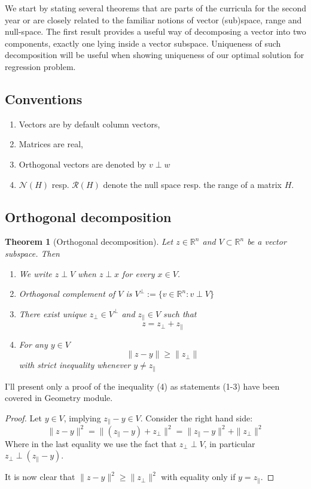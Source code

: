 \documentclass[a4paper]{article}
\theoremstyle{break}
\newtheorem{theorem}{Theorem}[section]
\newcommand{\R}{\mathbb{R}}
\newcommand{\Nu}{\mathcal{N}}
\newcommand{\Ra}{\mathcal{R}}
\newcommand{\pll}{\parallel}
\begin{document}
We start by stating several theorems that are parts of the curricula for the second year or are closely related to the familiar notions of vector (sub)space, range and null-space. The first result provides a useful way of decomposing a vector into two components, exactly one lying inside a vector subspace. Uniqueness of such decomposition will be useful when showing uniqueness of our optimal solution for regression problem.

\subsection{Conventions}
\begin{enumerate}
    \item Vectors are by default column vectors,
    \item Matrices are real,
    \item Orthogonal vectors are denoted by $ v \perp w$
    \item $\Nu(H)$ resp. $\Ra(H)$ denote the null space resp. the range of a matrix $H$.
\end{enumerate}

\subsection{Orthogonal decomposition}

\begin{theorem}[Orthogonal decomposition] \label{thm:projection}
    Let $z \in \R^n$ and $V \subset \R^n$ be a vector subspace. Then
    \begin{enumerate}
        \item We write $z \perp V$ when $ z \perp x$ for every $x \in V$.
        \item Orthogonal complement of $V$ is $V^\perp := \{ v \in \R^n : v \perp V\}$
        \item There exist unique $z_\perp \in V^\perp$ and $z_\pll \in V$ such that  
            \begin{equation}
                z = z_\perp + z_\pll
            \end{equation}
        \item For any $y \in V$
        \begin{equation}
                \| z - y \| \geq \| z_\perp \|
        \end{equation}
        with strict inequality whenever $y \neq z_\pll$
    \end{enumerate}
\end{theorem}
I'll present only a proof of the inequality (4) as statements (1-3) have been covered in Geometry module.
\begin{proof}
    Let $ y \in V $, implying $ z_\pll - y \in V$. Consider the right hand side:
    $$ \| z - y \|^2 = \| (z_\pll - y) + z_\perp \|^2 = \| z_\pll - y \|^2 + \| z_\perp \|^2 $$
    Where in the last equality we use the fact that $ z_\perp \perp V$,
    in particular $ z_\perp \perp (z_\pll - y)$.
    
    It is now clear that $ \| z - y \|^2 \geq \| z_\perp \|^2 $ with equality only if $ y = z_\pll$.
\end{proof}
\end{document}
